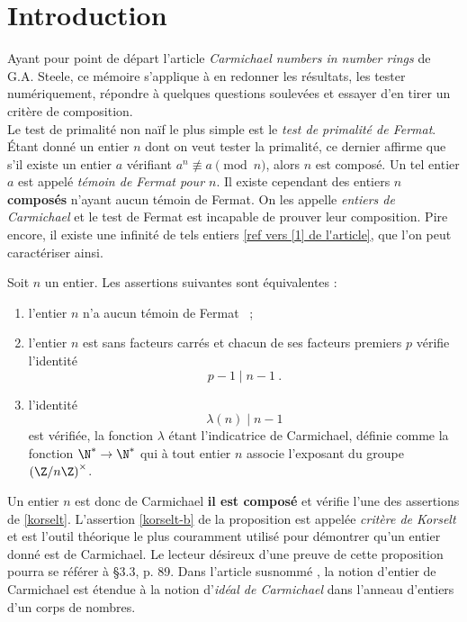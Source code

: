 \section*{Introduction}

Ayant pour point de départ l'article \textit{Carmichael numbers in number rings} \cite{article} de G.A. Steele, ce mémoire s'applique à en redonner les résultats, les tester numériquement, répondre à quelques questions soulevées et essayer d'en tirer un critère de composition. \\

Le test de primalité non naïf le plus simple est le \emph{test de primalité de Fermat}. Étant donné un entier $n$ dont on veut tester la primalité, ce dernier affirme que s'il existe un entier $a$ vérifiant $a^n \not \equiv a \pmod{n}$, alors $n$ est composé. Un tel entier $a$ est appelé \emph{témoin de Fermat pour $n$}. Il existe cependant des entiers $n$ \textbf{composés} n'ayant aucun témoin de Fermat. On les appelle \emph{entiers de Carmichael} et le test de Fermat est incapable de prouver leur composition. Pire encore, il existe une infinité de tels entiers \ref{ref vers [1] de l'article}, que l'on peut caractériser ainsi.

\begin{proposition}\label{korselt} Soit $n$ un entier. Les assertions suivantes sont équivalentes :
	\begin{enumerate}[font=\normalshape]
		\item l'entier $n$ n'a aucun témoin de Fermat ~;
		\item l'entier $n$ est sans facteurs carrés et chacun de ses facteurs premiers $p$ vérifie l'identité \[p-1 \mid n-1 ~.\] \label{korselt-b}
		\item l'identité \[\lambda(n) \mid n-1\] est vérifiée, la fonction $\lambda$ étant l'indicatrice de Carmichael, définie comme la fonction $\N^* \to \N^*$ qui à tout entier $n$ associe l'exposant du groupe $\left(\Z/n\Z\right)^\times$.
	\end{enumerate}
\end{proposition}

Un entier $n$ est donc de Carmichael \ssi \textbf{il est composé} et vérifie l'une des assertions de \ref{korselt}. L'assertion \ref{korselt-b} de la proposition est appelée \textit{critère de Korselt} et est l'outil théorique le plus couramment utilisé pour démontrer qu'un entier donné est de Carmichael. Le lecteur désireux d'une preuve de cette proposition pourra se référer à \cite{Demazure} §3.3, p. 89. Dans l'article susnommé \cite{article}, la notion d'entier de Carmichael est étendue à la notion d'\emph{idéal de Carmichael} dans l'anneau d'entiers d'un corps de nombres.


